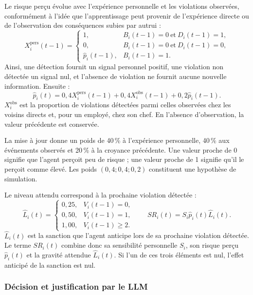 \documentclass[10pt,a4paper]{article}
\begin{document}
Le risque perçu évolue avec l’expérience personnelle et les violations
observées, conformément à l’idée que l’apprentissage peut provenir de
l’expérience directe ou de l’observation des conséquences subies par autrui
\cite{bandura1977} :
\[
X_i^{\mathrm{pers}}(t-1)=
\begin{cases}
1,&B_i(t-1)=0\ \text{et}\ D_i(t-1)=1,\\
0,&B_i(t-1)=0\ \text{et}\ D_i(t-1)=0,\\
\widehat p_i(t-1),&B_i(t-1)=1.
\end{cases}
\]
Ainsi, une détection fournit un signal personnel positif, une violation non
détectée un signal nul, et l’absence de violation ne fournit aucune nouvelle
information. Ensuite :
\[
\widehat p_i(t)=
0{,}4X_i^{\mathrm{pers}}(t-1)
+0{,}4X_i^{\mathrm{obs}}(t-1)
+0{,}2\widehat p_i(t-1).
\]
$X_i^{\mathrm{obs}}$ est la proportion de violations détectées parmi celles
observées chez les voisins directs et, pour un employé, chez son chef. En
l’absence d’observation, la valeur précédente est conservée.

La mise à jour donne un poids de 40\,\% à l’expérience personnelle, 40\,\% aux
événements observés et 20\,\% à la croyance précédente. Une valeur proche de 0
signifie que l’agent perçoit peu de risque ; une valeur proche de 1 signifie
qu’il le perçoit comme élevé. Les poids $(0{,}4;0{,}4;0{,}2)$ constituent une
hypothèse de simulation.

Le niveau attendu correspond à la prochaine violation détectée :
\[
\widehat L_i(t)=
\begin{cases}
0{,}25,&V_i(t-1)=0,\\
0{,}50,&V_i(t-1)=1,\\
1{,}00,&V_i(t-1)\geq2.
\end{cases}
\qquad
SR_i(t)=S_i\widehat p_i(t)\widehat L_i(t).
\]
$\widehat L_i(t)$ est la sanction que l’agent anticipe lors de sa prochaine
violation détectée. Le terme $SR_i(t)$ combine donc sa sensibilité personnelle
$S_i$, son risque perçu $\widehat p_i(t)$ et la gravité attendue
$\widehat L_i(t)$. Si l’un de ces trois éléments est nul, l’effet anticipé de
la sanction est nul.

\subsubsection{Décision et justification par le LLM}
\end{document}
